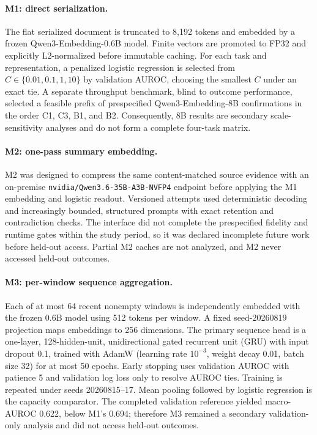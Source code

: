 \documentclass[pmlr,twocolumn,10pt]{jmlr}
\begin{document}
\paragraph{M1: direct serialization.}
The flat serialized document is truncated to 8,192 tokens and embedded by a
frozen Qwen3-Embedding-0.6B model. Finite vectors are promoted to FP32 and
explicitly L2-normalized before immutable caching. For each task and
representation, a penalized logistic regression is selected from
$C\in\{0.01,0.1,1,10\}$ by validation AUROC, choosing the smallest $C$ under an
exact tie. A separate throughput benchmark, blind to outcome performance,
selected a feasible prefix of prespecified Qwen3-Embedding-8B confirmations in
the order C1, C3, B1, and B2. Consequently, 8B results are secondary
scale-sensitivity analyses and do not form a complete four-task matrix.

\paragraph{M2: one-pass summary embedding.}
M2 was designed to compress the same content-matched source evidence with an
on-premise \texttt{nvidia/Qwen3.6-35B-A3B-NVFP4} endpoint before applying the
M1 embedding and logistic readout. Versioned attempts used deterministic
decoding and increasingly bounded, structured prompts with exact retention and
contradiction checks. The interface did not complete the prespecified fidelity
and runtime gates within the study period, so it was declared incomplete future
work before held-out access. Partial M2 caches are not analyzed, and M2 never
accessed held-out outcomes.

\paragraph{M3: per-window sequence aggregation.}
Each of at most 64 recent nonempty windows is independently embedded with the
frozen 0.6B model using 512 tokens per window. A fixed seed-20260819 projection
maps embeddings to 256 dimensions. The primary sequence head is a one-layer,
128-hidden-unit, unidirectional gated recurrent unit (GRU)
\citep{cho2014gru} with input dropout 0.1, trained with AdamW
\citep{loshchilov2019adamw}
(learning rate $10^{-3}$, weight decay 0.01, batch size 32) for at most 50
epochs. Early stopping uses validation AUROC with patience 5 and validation log
loss only to resolve AUROC ties. Training is repeated under seeds 20260815--17.
Mean pooling followed by logistic regression is the capacity comparator.
The completed validation reference yielded macro-AUROC 0.622, below M1's
0.694; therefore M3 remained a secondary validation-only analysis and did not
access held-out outcomes.
\end{document}
